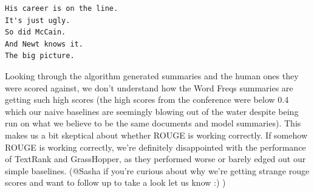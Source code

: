 \documentclass[10pt]{article}
\begin{document}
\begin{verbatim}
His career is on the line.
It's just ugly.
So did McCain.
And Newt knows it.
The big picture.
\end{verbatim}

Looking through the algorithm generated summaries and the human ones they were scored against, we don't understand how the Word Freqs summaries are getting such high scores (the high scores from the conference were below 0.4 which our naive baselines are seemingly blowing out of the water despite being run on what we believe to be the same documents and model summaries). This makes us a bit skeptical about whether ROUGE is working correctly. If somehow ROUGE is working correctly, we're definitely disappointed with the performance of TextRank and GrassHopper, as they performed worse or barely edged out our simple baselines. (@Sasha if you're curious about why we're getting strange rouge scores and want to follow up to take a look let us know :) )

\begin{table}[]
\centering
\caption{Resulting Rouge-1 and Rouge-2 Recall Scores}
\label{tab:results}
\end{table}
\end{document}
